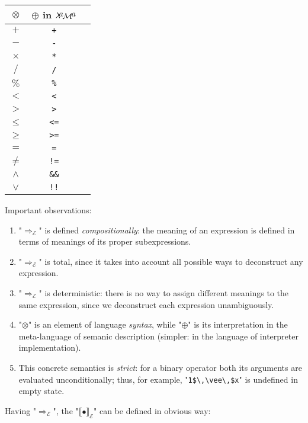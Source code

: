 \documentclass{article}
\newcommand{\sembr}[1]{\llbracket{#1}\rrbracket}
\newcommand{\lama}{$\lambda\kern -.1667em\lower -.5ex\hbox{$a$}\kern -.1000em\lower .2ex\hbox{$\mathcal M$}\kern -.1000em\lower -.5ex\hbox{$a$}$\xspace}
\begin{document}
\begin{center}
\begin{tabular}{c|cl}
  $\otimes$     & $\oplus$ in \lama\\
  \hline
  $+$      & \lstinline|+|   \\
  $-$      & \lstinline|-|   \\
  $\times$ & \lstinline|*|   \\
  $/$      & \lstinline|/|   \\
  $\%$     & \lstinline|%|   \\
  $<$      & \lstinline|<|   \\
  $>$      & \lstinline|>|   \\
  $\le$    & \lstinline|<=|  \\
  $\ge$    & \lstinline|>=|  \\
  $=$      & \lstinline|=|   \\
  $\ne$    & \lstinline|!=|  \\
  $\wedge$ & \lstinline|&&|  \\
  $\vee$   & \lstinline/!!/ 
\end{tabular}
\end{center}

Important observations:

\begin{enumerate}
  \item "$\Rightarrow_{\mathscr E}$" is defined \emph{compositionally}: the meaning of an expression is defined in terms of meanings
  of its proper subexpressions.
  \item "$\Rightarrow_{\mathscr E}$" is total, since it takes into account all possible ways to deconstruct any expression.
  \item "$\Rightarrow_{\mathscr E}$" is deterministic: there is no way to assign different meanings to the same expression, since
  we deconstruct each expression unambiguously.
  \item "$\otimes$" is an element of language \emph{syntax}, while "$\oplus$" is its interpretation in the meta-language of
  semanic description (simpler: in the language of interpreter implementation).
  \item This concrete semantics is \emph{strict}: for a binary operator both its arguments are evaluated unconditionally; thus,
  for example, "\lstinline|1$\,\vee\,$x|" is undefined in empty state.
\end{enumerate}

Having "$\Rightarrow_{\mathscr E}$", the "$\sembr{\bullet}_{\mathscr E}$" can be defined in obvious way:
\end{document}
